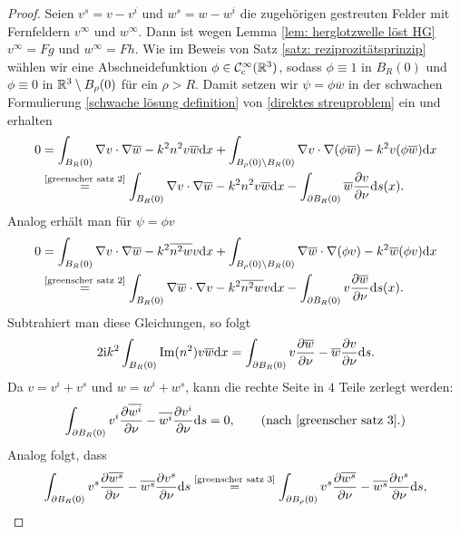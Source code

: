 \begin{proof}
	Seien \(v^s=v-v^i\) und \(w^s=w-w^i\) die zugehörigen gestreuten Felder mit Fernfeldern \(v^\infty\) und \(w^\infty\). Dann ist wegen Lemma \ref{lem: herglotzwelle löst HG} \(v^\infty=Fg\) und \(w^\infty=Fh\). Wie im Beweis von Satz \ref{satz: reziprozitätsprinzip} wählen wir eine Abschneidefunktion \(\phi\in\mathcal{C}_{\mathrm{c}}^\infty(\mathbb{R}^3)\), sodass \(\phi\equiv1\) in \(B_R(0)\) und \(\phi\equiv0\) in \(\mathbb{R}^3\setminus B_\rho(0)\) für ein \(\rho>R\). Damit setzen wir \(\psi=\phi\overline{w}\) in der schwachen Formulierung \eqref{schwache lösung definition} von \eqref{direktes streuproblem} ein und erhalten
	\begin{align*}
		0&=\int_{B_R(0)}\nabla v\cdot \nabla \overline{w}-k^2n^2v\overline{w}\mathrm{d}x+\int_{B_\rho(0)\setminus B_R(0)} \nabla v\cdot \nabla(\phi\overline{w})-k^2v(\phi\overline{w})\mathrm{d}x\\
		&\overset{\scriptsize \eqref{greenscher satz 2}}{=}\int_{B_R(0)}\nabla v\cdot\nabla\overline{w}-k^2n^2v\overline{w}\mathrm{d}x-\int_{\partial B_R(0)}\overline{w}\frac{\partial v}{\partial\nu}\mathrm{d}s(x).
	\end{align*}
	Analog erhält man für \(\psi=\phi v\)
	\begin{align*}
		0&=\int_{B_R(0)}\nabla v\cdot \nabla \overline{w}-k^2\overline{n^2w}v\mathrm{d}x+\int_{B_\rho(0)\setminus B_R(0)} \nabla \overline{w}\cdot \nabla(\phi v)-k^2\overline{w}(\phi v)\mathrm{d}x\\
		&\overset{\scriptsize \eqref{greenscher satz 2}}{=}\int_{B_R(0)}\nabla\overline{w}\cdot\nabla v-k^2\overline{n^2w}v\mathrm{d}x-\int_{\partial B_R(0)}v\frac{\partial \overline{w}}{\partial\nu}\mathrm{d}s(x).
	\end{align*}
	Subtrahiert man diese Gleichungen, so folgt
	\begin{equation*}
		2\mathrm{i} k^2\int_{B_R(0)}\operatorname{Im}(n^2)v\overline{w}\mathrm{d}x=\int_{\partial B_R(0)}v\frac{\partial \overline{w}}{\partial\nu}-\overline{w}\frac{\partial v}{\partial\nu}\mathrm{d}s.
	\end{equation*}
	Da \(v=v^i+v^s\) und \(w=w^i+w^s\), kann die rechte Seite in \(4\) Teile zerlegt werden:
	\begin{equation*}
		\int_{\p B_R(0)}v^i\frac{\p \overline{w^i}}{\p\normal}-\overline{w^i}\frac{\p v^i}{\p\normal}\ds=0,\tag{nach \eqref{greenscher satz 3}.}
	\end{equation*}
	Analog folgt, dass
	\begin{equation*}
		\int_{\p B_R(0)} v^s\frac{\p\overline{w^s}}{\p\normal}-\overline{w^s}\frac{\p v^s}{\p\normal}\ds\overset{\scriptsize\eqref{greenscher satz 3}}{=}\int_{\p B_\rho(0)}v^s\frac{\p\overline{w^s}}{\p\normal}-\overline{w^s}\frac{\p v^s}{\p\normal}\ds,

\end{equation*}
\end{proof}
